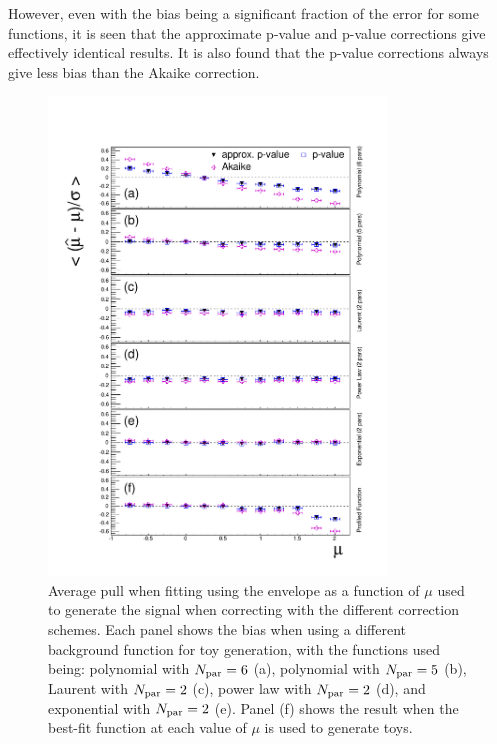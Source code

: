 However,
even with the bias being a significant fraction of the error for some functions,
it is seen that the approximate p-value and p-value corrections give
effectively identical results. It is also found
that the p-value corrections always give less bias than the Akaike correction.
%
\begin{figure}[tbp]
\centering
\includegraphics[width=0.8\textwidth]{correction/AllOrderFunctions_call.pdf}
\caption{Average pull when fitting using the envelope as a function of $\mu$
used to generate the signal when correcting
with the different \nll correction schemes.
Each panel shows the bias when using
a different background function for toy generation, with the functions
used being: polynomial with $N_{\rm par}=6$ (a),
polynomial with $N_{\rm par}=5$ (b), Laurent with $N_{\rm par}=2$ (c),
power law with $N_{\rm par}=2$ (d), and exponential with $N_{\rm par}=2$ (e).
Panel (f) shows the result when the best-fit function at each
value of $\mu$ is used to generate toys.
}
\label{fig:correction:allorderbias}
\end{figure}

